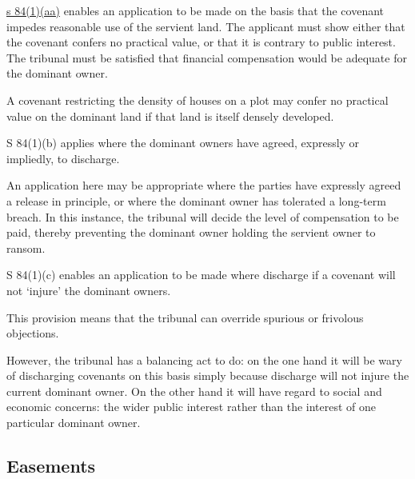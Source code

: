 \documentclass[
]{article}
\newenvironment{Shaded}{}{}
\newcommand{\NormalTok}[1]{#1}
\begin{document}
\href{https://www.legislation.gov.uk/ukpga/Geo5/15-16/20/section/84}{s
84(1)(aa)} enables an application to be made on the basis that the
covenant impedes reasonable use of the servient land. The applicant must
show either that the covenant confers no practical value, or that it is
contrary to public interest. The tribunal must be satisfied that
financial compensation would be adequate for the dominant owner.

\begin{Shaded}
\begin{Highlighting}[]
\NormalTok{A covenant restricting the density of houses on a plot may confer no practical value on the dominant land if that land is itself densely developed.}
\end{Highlighting}
\end{Shaded}

S 84(1)(b) applies where the dominant owners have agreed, expressly or
impliedly, to discharge.

\begin{Shaded}
\begin{Highlighting}[]
\NormalTok{An application here may be appropriate where the parties have expressly agreed a release in principle, or where the dominant owner has tolerated a long{-}term breach. In this instance, the tribunal will decide the level of compensation to be paid, thereby preventing the dominant owner holding the servient owner to ransom.}
\end{Highlighting}
\end{Shaded}

S 84(1)(c) enables an application to be made where discharge if a
covenant will not `injure' the dominant owners.

This provision means that the tribunal can override spurious or
frivolous objections.

However, the tribunal has a balancing act to do: on the one hand it will
be wary of discharging covenants on this basis simply because discharge
will not injure the current dominant owner. On the other hand it will
have regard to social and economic concerns: the wider public interest
rather than the interest of one particular dominant owner.

\hypertarget{easements}{%
\subsection{Easements}\label{easements}}
\end{document}
